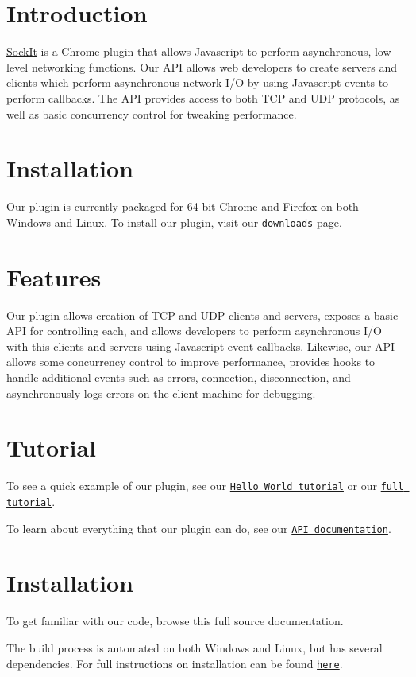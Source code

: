 \hypertarget{index_intro_sec}{}\section{Introduction}\label{index_intro_sec}
\hyperlink{classSockIt}{SockIt} is a Chrome plugin that allows Javascript to perform asynchronous, low-\/level networking functions. Our API allows web developers to create servers and clients which perform asynchronous network I/O by using Javascript events to perform callbacks. The API provides access to both TCP and UDP protocols, as well as basic concurrency control for tweaking performance.\hypertarget{index_install_sec}{}\section{Installation}\label{index_install_sec}
Our plugin is currently packaged for 64-\/bit Chrome and Firefox on both Windows and Linux. To install our plugin, visit our \href{http://extensions/chrome/sockit/tutorial/downloads.html}{\tt downloads} page.\hypertarget{index_features_sec}{}\section{Features}\label{index_features_sec}
Our plugin allows creation of TCP and UDP clients and servers, exposes a basic API for controlling each, and allows developers to perform asynchronous I/O with this clients and servers using Javascript event callbacks. Likewise, our API allows some concurrency control to improve performance, provides hooks to handle additional events such as errors, connection, disconnection, and asynchronously logs errors on the client machine for debugging.\hypertarget{index_tutorial_sec}{}\section{Tutorial}\label{index_tutorial_sec}
To see a quick example of our plugin, see our \href{http://extensions/chrome/sockit/tutorial/tutorial.html}{\tt Hello World tutorial} or our \href{http://extensions/chrome/sockit/tutorial/full_tutorial.html}{\tt full tutorial}. 

To learn about everything that our plugin can do, see our \href{http://extensions/chrome/sockit/tutorial/api_documentation.html}{\tt API documentation}.\hypertarget{index_install_sec}{}\section{Installation}\label{index_install_sec}
To get familiar with our code, browse this full source documentation. 

The build process is automated on both Windows and Linux, but has several dependencies. For full instructions on installation can be found \href{../index.html}{\tt here}.  